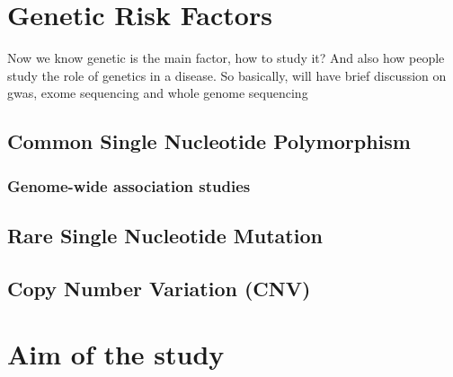 \section{Genetic Risk Factors}
Now we know genetic is the main factor, how to study it?
And also how people study the role of genetics in a disease.
So basically, will have brief discussion on gwas, exome sequencing and whole genome sequencing
\subsection{Common Single Nucleotide Polymorphism}
\subsubsection{Genome-wide association studies}
\subsection{Rare Single Nucleotide Mutation}
\subsection{Copy Number Variation (CNV)}

\section{Aim of the study}


